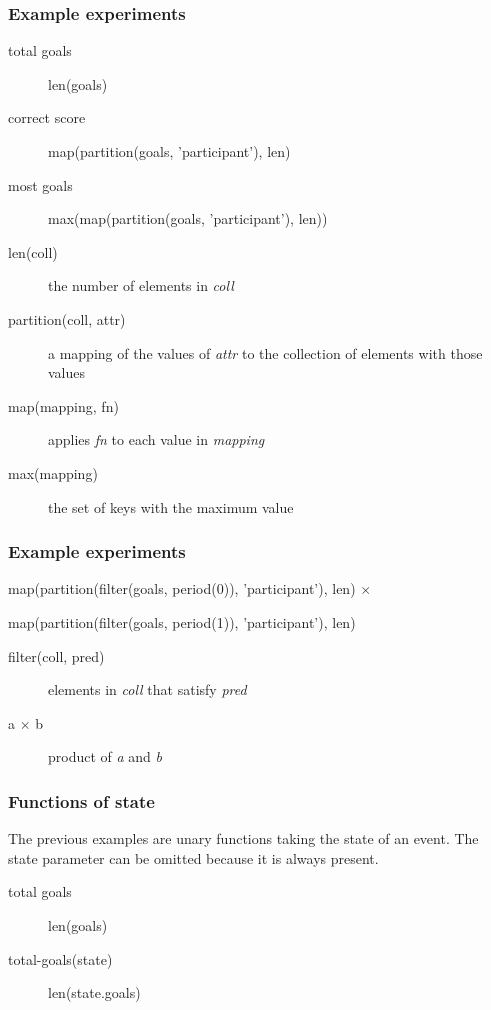 \documentclass{beamer}
\begin{document}
\begin{frame}
\frametitle{Example experiments}
\begin{description}
\item[total goals] len(goals)
\item[correct score] map(partition(goals, 'participant'), len)
\item[most goals] max(map(partition(goals, 'participant'), len))
\end{description}

\begin{description}
\item[len(coll)] the number of elements in \emph{coll}
\item[partition(coll, attr)] a mapping of the values of \emph{attr} to the
collection of elements with those values
\item[map(mapping, fn)] applies \emph{fn} to each value in \emph{mapping}
\item[max(mapping)] the set of keys with the maximum value
\end{description}
\end{frame}

\begin{frame}
\frametitle{Example experiments}
\begin{example}
map(partition(filter(goals, period(0)), 'participant'), len) $\times$

map(partition(filter(goals, period(1)), 'participant'), len)
\end{example}

\begin{description}
\item[filter(coll, pred)] elements in \emph{coll} that satisfy \emph{pred}
\item[a $\times$ b] product of \emph{a} and \emph{b}
\end{description}
\end{frame}

\begin{frame}
\frametitle{Functions of state}
The previous examples are unary functions taking the state of an event.  The
state parameter can be omitted because it is always present.

\begin{description}
\item[total goals] len(goals)
\item[total-goals(state)] len(state.goals)
\end{description}
\end{frame}
\end{document}
